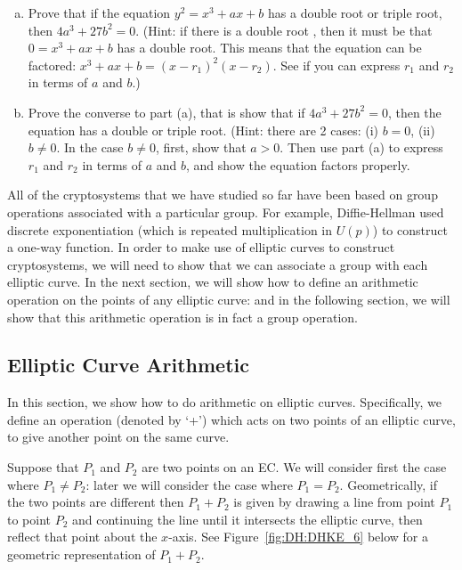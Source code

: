 \begin{exercise}{}
		\begin{enumerate}[(a)] 
	\item  Prove that if the equation $y^2 = x^3 + ax + b$ has a double root or triple root, then $4a^3+27b^2=0$. (Hint:  if there is a double root , then it must be that $0 = x^3 + ax + b$ has a double root. This means that the equation can be factored:  $x^3 + ax+b = (x-r_1)^2(x-r_2)$.  See if you can express $r_1$ and $r_2$ in terms of $a$ and $b$.)\\
	\item Prove the converse to part (a), that is show that if $4a^3 + 27b ^2=0$, then the equation has a double or triple root.  (Hint: there are 2 cases: (i) $b=0$, (ii) $b \neq 0$. In the case $b \neq 0$, first, show that $a > 0$.  Then use part (a) to express $r_1$ and $r_2$ in terms of $a$ and $b$, and show the equation factors properly.
\end {enumerate} 
\end{exercise}

All of the cryptosystems that we have studied so far have been based on group operations associated with a particular group. For example, Diffie-Hellman used discrete exponentiation (which is repeated multiplication in $U(p)$) to construct a one-way function. In order to make use of elliptic curves to construct cryptosystems, we will need to show that we can associate a group with each elliptic curve. In the next section, we will show how to define an arithmetic operation on the points of  any  elliptic curve: and in the following section, we will show that this arithmetic operation is in fact a group operation.

\subsection{Elliptic Curve Arithmetic}\label{sec:ECA}
In this section, we show how to do arithmetic on elliptic curves. Specifically, we define an operation (denoted by `+') which acts on two points of an elliptic curve, to give another point on the same curve. 

Suppose that $P_1$ and $P_2$ are two points on an EC. We will consider first the case where $P_1 \neq P_2$: later we will consider the case where  $P_1= P_2$. Geometrically, if the two points are different then $P_1 + P_2$ is given by drawing a line from point $P_1$ to point $P_2$ and continuing the line until it intersects the elliptic curve, then reflect that point about the $x$-axis.  See Figure~\ref{fig:DH:DHKE_6} below for a geometric representation of $P_1 + P_2$.

